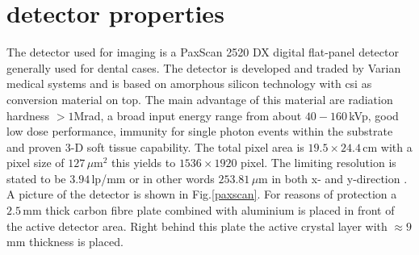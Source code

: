 \section{detector properties}
The detector used for imaging is a PaxScan 2520 DX digital flat-panel detector generally used for dental cases. The detector is developed and traded by Varian medical systems and is based on amorphous silicon technology with \gls{csi} as conversion material on top. The main advantage of this material are radiation hardness $> 1$Mrad, a broad input energy range from about $40 - 160\,$kVp, good low dose performance, immunity for single photon events within the substrate and proven 3-D soft tissue capability. The total pixel area is $19.5\times 24.4\,$cm with a pixel size of $127\, \mu\text{m}^{2}$ this yields to $1536 \times 1920$ pixel. The limiting resolution is stated to be $3.94\,$lp/mm or in other words $253.81\, \mu$m in both x- and y-direction \citep{Paxscan}. A picture of the detector is shown in Fig.\ref{paxscan}. For reasons of protection a $2.5\,$mm thick carbon fibre plate combined with aluminium is placed in front of the active detector area. Right behind this plate the active crystal layer with $\approx 9$mm thickness is placed.    

















